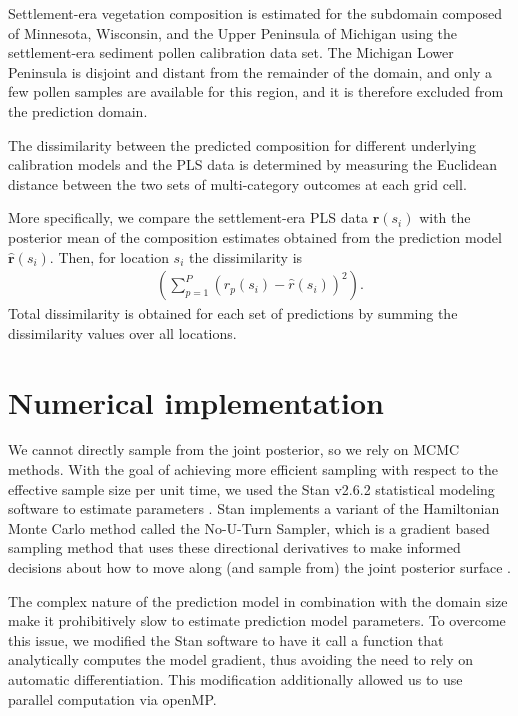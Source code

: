 \documentclass[12pt]{article}
\begin{document}
Settlement-era vegetation composition is estimated for the subdomain
composed of Minnesota, Wisconsin, and the Upper Peninsula of Michigan
using the settlement-era sediment pollen calibration data set. The
Michigan Lower Peninsula is disjoint and distant from the remainder of
the domain, and only a few pollen samples are available for this
region, and it is therefore excluded from the prediction domain.

The dissimilarity between the predicted composition for different
underlying calibration models and the PLS data is determined by
measuring the Euclidean distance between the two sets of
multi-category outcomes at each grid cell.

More specifically, we compare the settlement-era PLS data
$\bm{r}(s_i)$ with the posterior mean of the composition estimates
obtained from the prediction model $\hat{\bm{r}}(s_i)$. Then, for
location $s_i$ the dissimilarity is
\begin{align*}
\left( \sum_{p=1}^{P} (r_p(s_i) - \hat{r}(s_i))^2 \right).
\end{align*}
Total dissimilarity is obtained for each set of predictions by summing
the dissimilarity values over all locations.

\section{Numerical implementation}
\label{sec:imp}

We cannot directly sample from the joint posterior, so we rely on MCMC
methods. With the goal of achieving more efficient sampling with
respect to the effective sample size per unit time, we used the Stan
v2.6.2 statistical modeling software to estimate parameters
\citep{stan-software:2014}. Stan implements a variant of the
Hamiltonian Monte Carlo method called the No-U-Turn Sampler, which is
a gradient based sampling method that uses these directional
derivatives to make informed decisions about how to move along (and
sample from) the joint posterior surface \citep{hoffman2011nuts}.

The complex nature of the prediction model in combination with the
domain size make it prohibitively slow to estimate prediction model
parameters. To overcome this issue, we modified the Stan software to
have it call a function that analytically computes the model gradient,
thus avoiding the need to rely on automatic differentiation. This
modification additionally allowed us to use parallel computation via
openMP.
\end{document}
